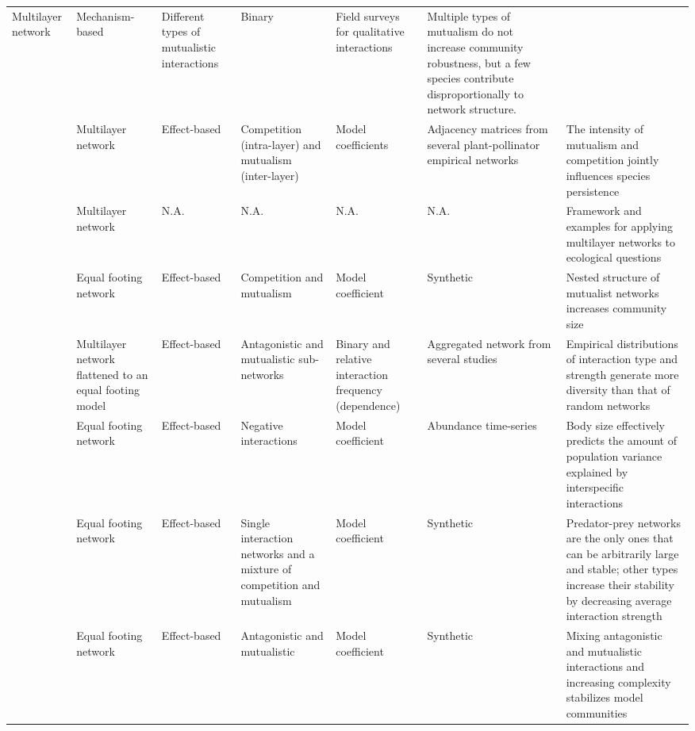 {\begin{landscape}
\begin{footnotesize}
\begin{longtable}{p{1.5cm}p{1.5cm}p{2cm}p{2cm}p{2cm}p{2cm}p{4cm}}
Multilayer network &
Mechanism-based &
Different types of mutualistic interactions &
Binary &
Field surveys for qualitative interactions &
Multiple types of mutualism do not increase community robustness, but a few species contribute disproportionally to network structure.\\%
\citealt{Gracia-Lazaro2018} & %
Multilayer network &
Effect-based &
Competition (intra-layer) and mutualism (inter-layer) &
Model coefficients &
Adjacency matrices from several plant-pollinator empirical networks &
The intensity of mutualism and competition jointly influences species persistence\\%
\citealt{Pilosof2017} & %
Multilayer network &
N.A. &
N.A. &
N.A. &
N.A. &
Framework and examples for applying multilayer networks to ecological questions\\%
\citealt{Bastolla2009} & %
Equal footing network &
Effect-based &
Competition and mutualism &
Model coefficient &
Synthetic &
Nested structure of mutualist networks increases community size\\%
\citealt{Melian2009} & %
Multilayer network flattened to an equal footing model &
Effect-based &
Antagonistic and mutualistic sub-networks &
Binary and relative interaction frequency (dependence) &
Aggregated network from several studies &
Empirical distributions of interaction type and strength generate more diversity than that of random networks\\%
\citealt{Almaraz2011} & %
Equal footing network &
Effect-based &
Negative interactions &
Model coefficient &
Abundance time-series &
Body size effectively predicts the amount of population variance explained by interspecific interactions\\%
\citealt{Allesina2012} & %
Equal footing network &
Effect-based &
Single interaction networks and a mixture of competition and mutualism &
Model coefficient &
Synthetic &
Predator-prey networks are the only ones that can be arbitrarily large and stable; other types increase their stability by decreasing average interaction strength\\%
\citealt{Mougi2012} & %
Equal footing network &
Effect-based &
Antagonistic and mutualistic &
Model coefficient &
Synthetic &
Mixing antagonistic and mutualistic interactions and increasing complexity stabilizes model communities\\%

\end{longtable}
\end{footnotesize}
\end{landscape}}
